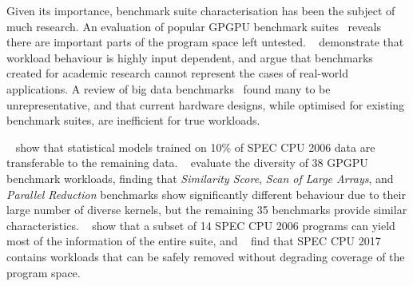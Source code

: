 Given its importance, benchmark suite characterisation has been the subject of much research. An evaluation of popular GPGPU benchmark suites~\cite{Ryoo2015} reveals there are important parts of the program space left untested.
\citeauthor{Xiong2013}~\cite{Xiong2013} demonstrate that workload behaviour is highly input dependent, and argue that benchmarks created for academic research cannot represent the cases of real-world applications.
A review of big data benchmarks~\cite{Ferdman2012} found many to be unrepresentative, and that current hardware designs, while optimised for existing benchmark suites, are inefficient for true workloads.

\citeauthor{Ould-Ahmed-Vall2008}~\cite{Ould-Ahmed-Vall2008} show that statistical models trained on 10\% of SPEC CPU 2006 data are transferable to the remaining data.
\citeauthor{Goswami2010}~\cite{Goswami2010} evaluate the diversity of 38 GPGPU benchmark workloads, finding that \emph{Similarity Score}, \emph{Scan of Large Arrays}, and \emph{Parallel Reduction} benchmarks show significantly different behaviour due to their large number of diverse kernels, but the remaining 35 benchmarks provide similar characteristics.
\citeauthor{Phansalkar2007}~\cite{Phansalkar2007} show that a subset of 14 SPEC CPU 2006 programs can yield most of the information of the entire suite, and
\citeauthor{Draft2018}~\cite{Draft2018} find that SPEC CPU 2017 contains workloads that can be safely removed without degrading coverage of the program space.


